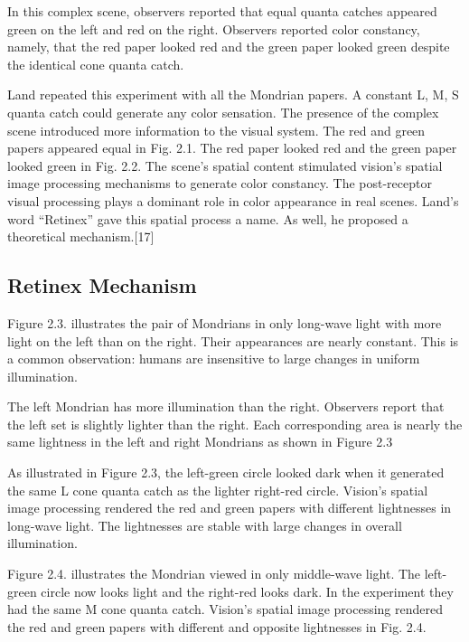 In this complex scene, observers reported that equal quanta catches appeared green on the left and red on the right. Observers reported color constancy, namely, that the red paper looked red and the green paper looked green despite the identical cone quanta catch.

Land repeated this experiment with all the Mondrian papers. A constant L, M, S quanta catch could generate any color sensation. The presence of the complex scene introduced more information to the visual system. The red and green papers appeared equal in Fig. 2.1. The red paper looked red and the green paper looked green in Fig. 2.2. The scene’s spatial content stimulated vision’s spatial image processing mechanisms to generate color constancy. The post-receptor visual processing plays a dominant role in color appearance in real scenes. Land’s word “Retinex” gave this spatial process a name. As well, he proposed a theoretical mechanism.[17]

\subsection{Retinex Mechanism}
Figure 2.3. illustrates the pair of Mondrians in only long-wave light with more light on the left than on the right. Their appearances are nearly constant. This is a common observation: humans are insensitive to large changes in uniform illumination.


The left Mondrian has more illumination than the right. Observers report that the left set is slightly lighter than the right. Each corresponding area is nearly the same lightness in the left and right Mondrians as shown in Figure 2.3

As illustrated in Figure 2.3, the left-green circle looked dark when it generated the same L cone quanta catch as the lighter right-red circle. Vision’s spatial image processing rendered the red and green papers with different lightnesses in long-wave light. The lightnesses are stable with large changes in overall illumination.

Figure 2.4. illustrates the Mondrian viewed in only middle-wave light. The left-green circle now looks light and the right-red looks dark. In the experiment they had the same M cone quanta catch. Vision’s spatial image processing rendered the red and green papers with different and opposite lightnesses in Fig. 2.4.

